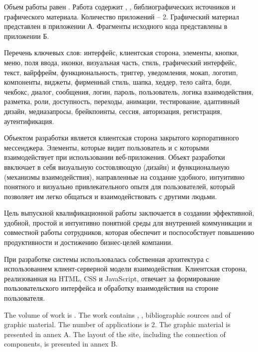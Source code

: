 
Объем работы равен . Работа содержит , ,  библиографических источников и  графического материала. Количество приложений – 2. Графический материал представлен в приложении А. Фрагменты исходного кода представлены в приложении Б.

Перечень ключевых слов: интерфейс, клиентская сторона, элементы, кнопки, меню, поля ввода, иконки, визуальная часть, стиль, графический интерфейс, текст, вайрфрейм, функциональность, триггер, уведомления, мокап, логотип, компоненты, виджеты, фирменный стиль, шапка, хеддер, тело сайта, боди, чекбокс, диалог, сообщения, логин, пароль, пользователь, логика взаимодействия, разметка, роли, доступность, переходы, анимации, тестирование, адаптивный дизайн, медиазапросы, брейкпоинты, сессия, авторизация, регистрация, аутентификация.

Объектом разработки является клиентская сторона закрытого корпоративного мессенджера. Элементы, которые видит пользователь и с которыми взаимодействует при использовании веб-приложения. Объект разработки ввключает в себя визуальную состовляющую (дизайн) и функциональную (механизмы взаимодействия), направленные на создание удобного, интуитивно понятного и визуально привлекательного опытя для пользователей, который позволяет им легко общаться и взаимодействовать с другими людьми. 

Цель выпускной квалификационной работы заключается в создании эффективной, удобной, простой и интуитивно понятной среды для внутренней коммуникации и совместной работы сотрудников, которая обеспечит и поспособствует повышению продуктивности и достижению бизнес-целей компании.

При разработке системы использовалась собственная архитектура с использованием клиент-серверной модели взаимодействия. Клиентская сторона, реализованная на HTML, CSS и JavaScript, отвечает за формирование пользовательского интерфейса и обработку взаимодействия на стороне пользователя.

  
The volume of work is . The work contains , ,  bibliographic sources and  of graphic material. The number of applications is 2. The graphic material is presented in annex A. The layout of the site, including the connection of components, is presented in annex B.

